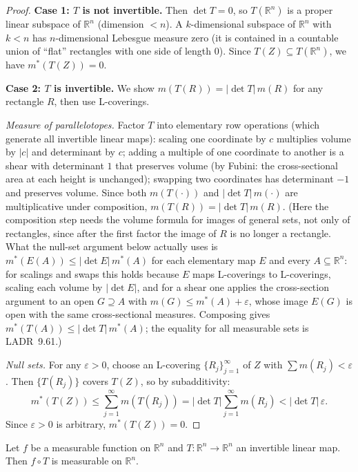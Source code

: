 \documentclass[11pt]{report}
\begin{document}
\begin{proof}
\textbf{Case 1: $T$ is not invertible.} Then $\det T = 0$, so $T(\mathbb{R}^n)$ is a proper linear subspace of $\mathbb{R}^n$ (dimension $< n$). A $k$-dimensional subspace of $\mathbb{R}^n$ with $k < n$ has $n$-dimensional Lebesgue measure zero (it is contained in a countable union of ``flat'' rectangles with one side of length $0$). Since $T(Z) \subseteq T(\mathbb{R}^n)$, we have $m^*(T(Z)) = 0$.

\textbf{Case 2: $T$ is invertible.} We show $m(T(R)) = |\!\det T|\,m(R)$ for any rectangle $R$, then use L-coverings.

\textit{Measure of parallelotopes.} Factor $T$ into elementary row operations (which generate all invertible linear maps): scaling one coordinate by $c$ multiplies volume by $|c|$ and determinant by $c$; adding a multiple of one coordinate to another is a shear with determinant $1$ that preserves volume (by Fubini: the cross-sectional area at each height is unchanged); swapping two coordinates has determinant $-1$ and preserves volume. Since both $m(T(\cdot))$ and $|\!\det T|\,m(\cdot)$ are multiplicative under composition, $m(T(R)) = |\!\det T|\,m(R)$. (Here the composition step needs the volume formula for images of general sets, not only of rectangles, since after the first factor the image of $R$ is no longer a rectangle. What the null-set argument below actually uses is $m^*(E(A)) \leq |\!\det E|\,m^*(A)$ for each elementary map $E$ and every $A \subseteq \mathbb{R}^n$: for scalings and swaps this holds because $E$ maps L-coverings to L-coverings, scaling each volume by $|\!\det E|$, and for a shear one applies the cross-section argument to an open $G \supseteq A$ with $m(G) \leq m^*(A) + \varepsilon$, whose image $E(G)$ is open with the same cross-sectional measures. Composing gives $m^*(T(A)) \leq |\!\det T|\,m^*(A)$; the equality for all measurable sets is LADR~9.61.)

\textit{Null sets.} For any $\varepsilon > 0$, choose an L-covering $\{R_j\}_{j=1}^{\infty}$ of $Z$ with $\sum m(R_j) < \varepsilon$. Then $\{T(R_j)\}$ covers $T(Z)$, so by subadditivity:
\[
m^*(T(Z)) \leq \sum_{j=1}^{\infty} m(T(R_j)) = |\!\det T| \sum_{j=1}^{\infty} m(R_j) < |\!\det T|\,\varepsilon.
\]
Since $\varepsilon > 0$ is arbitrary, $m^*(T(Z)) = 0$.
\end{proof}

\begin{corbox}
Let $f$ be a measurable function on $\mathbb{R}^n$ and $T: \mathbb{R}^n \to \mathbb{R}^n$ an invertible linear map. Then $f \circ T$ is measurable on $\mathbb{R}^n$.
\end{corbox}
\end{document}
